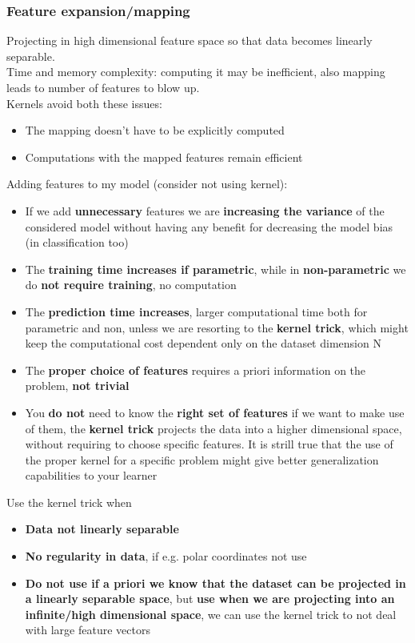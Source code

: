 \subsubsection{Feature expansion/mapping}
    Projecting in high dimensional feature space so that data becomes linearly separable. \\
    Time and memory complexity: computing it may be inefficient, also mapping leads to number of features to blow up. \\
    Kernels avoid both these issues:
    \begin{itemize}
        \item The mapping doesn't have to be explicitly computed
        \item Computations with the mapped features remain efficient
    \end{itemize}
    Adding features to my model (consider not using kernel):
    \begin{itemize}
        \item If we add \textbf{unnecessary} features we are \textbf{increasing the variance} of the considered model without having any benefit for decreasing the model bias (in classification too)
        \item The \textbf{training time increases if parametric}, while in \textbf{non-parametric} we do \textbf{not require training}, no computation
        \item The \textbf{prediction time increases}, larger computational time both for parametric and non, unless we are resorting to the \textbf{kernel trick}, which might keep the computational cost dependent only on the dataset dimension N
        \item The \textbf{proper choice of features} requires a priori information on the problem, \textbf{not trivial}
        \item You \textbf{do not} need to know the \textbf{right set of features} if we want to make use of them, the \textbf{kernel trick} projects the data into a higher dimensional space, without requiring to choose specific features. It is strill true that the use of the proper kernel for a specific problem might give better generalization capabilities to your learner
    \end{itemize}
    Use the kernel trick when
    \begin{itemize}
        \item \textbf{Data not linearly separable}
        \item \textbf{No regularity in data}, if e.g. polar coordinates not use
        \item \textbf{Do not use if a priori we know that the dataset can be projected in a linearly separable space}, but \textbf{use when we are projecting into an infinite/high dimensional space}, we can use the kernel trick to not deal with large feature vectors
    \end{itemize}

